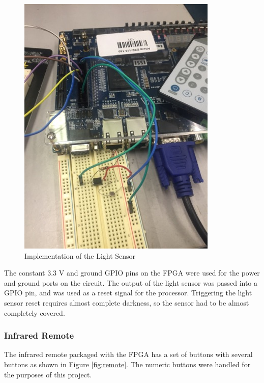 \documentclass{article}
\begin{document}
        \begin{figure}[H]
            \centering
            \includegraphics[scale=0.6]{lightpicsensor.jpg}
            \caption{Implementation of the Light Sensor}
            \label{fig:actualLightSensor}
        \end{figure}
        
    The constant 3.3 V and ground GPIO pins on the FPGA were used for the power and ground ports on the circuit. The output of the light sensor was passed into a GPIO pin, and was used as a reset signal for the processor. Triggering the light sensor reset requires almost complete darkness, so the sensor had to be almost completely covered.
    
    \subsubsection{Infrared Remote}
        The infrared remote packaged with the FPGA has a set of buttons with several buttons as shown in Figure \ref{fig:remote}. The numeric buttons were handled for the purposes of this project. 
    
\end{document}
